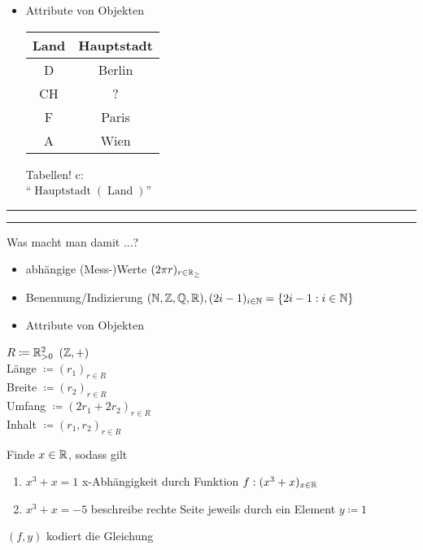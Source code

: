 \documentclass{myclass}
\begin{document}
\begin{itemize}
	\item Attribute von Objekten\\[1em]
		\begin{tabular}{c|c}
			Land & Hauptstadt\\
			\hline
			D	& Berlin\\
			CH	& ?\\
			F	& Paris\\
			A	& Wien\\
		\end{tabular}
		\hspace{2em}
		\begin{minipage}{0.5\textwidth}
			Tabellen! c:\\
			``$\operatorname{Hauptstadt}(\operatorname{Land})$''
		\end{minipage}
\end{itemize}

\hrule width 50pt \kern 1pt \hrule width 50pt
Was macht man damit ...?
\begin{itemize}
	\item abhängige (Mess-)Werte \qquad $ (2 \pi r )_{ r \in \mathbb{R}_{\geq} } $
	\item Benennung/Indizierung \qquad $ ( \mathbb{N}, \mathbb{Z}, \mathbb{Q}, \mathbb{R} ), ( 2i - 1 )_{ i \in \mathbb{N} } = \{ 2i - 1 : i \in \mathbb{N} \} $
	\item Attribute von Objekten
\end{itemize}

\hspace{2em}
\begin{minipage}{0.5\textwidth}
	$ R \coloneqq \mathbb{R}_{>0}^{2} $ \qquad $ ( \mathbb{Z}, + ) $\\
	Länge $ \coloneqq (r_1)_{r \in R} $\\
	Breite $ \coloneqq ( r_2 )_{r \in R} $\\
	Umfang $ \coloneqq ( 2r_1 + 2r_2)_{r \in R} $\\
	Inhalt $ \coloneqq ( r_1, r_2 )_{r \in R} $
\end{minipage}

\begin{example}[``Gleichungen'']
	Finde $ x \in \mathbb{R} $, sodass gilt
	\begin{enumerate}[label=\alph*)]
		\item $ x^3 + x = 1 $ \quad\qquad x-Abhängigkeit durch Funktion $ f : (x^3 + x )_{x \in \mathbb{R}} $
		\item $ x^3 + x =  -5 $ \qquad beschreibe rechte Seite jeweils durch ein Element $ y \coloneqq 1 $
	\end{enumerate}
	$ ( f, y ) $ kodiert die Gleichung
\end{example}
\end{document}
